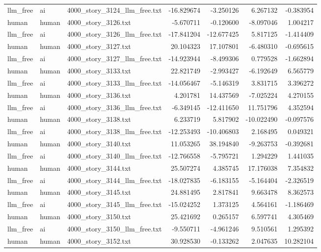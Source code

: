 \begin{longtable}{lllrrrr}
llm\_free & ai & 4000\_story\_3124\_llm\_free.txt & -16.829674 & -3.250126 & 6.267132 & -0.383954 \\
human & human & 4000\_story\_3126.txt & -5.670711 & -0.120600 & -8.097046 & 1.004217 \\
llm\_free & ai & 4000\_story\_3126\_llm\_free.txt & -17.841204 & -12.677425 & 5.817125 & -1.414409 \\
human & human & 4000\_story\_3127.txt & 20.104323 & 17.107801 & -6.480310 & -0.695615 \\
llm\_free & ai & 4000\_story\_3127\_llm\_free.txt & -14.923944 & -8.499306 & 0.779528 & -1.662894 \\
human & human & 4000\_story\_3133.txt & 22.821749 & -2.993427 & -6.192649 & 6.565779 \\
llm\_free & ai & 4000\_story\_3133\_llm\_free.txt & -14.056467 & -5.146319 & 3.831715 & 3.396272 \\
human & human & 4000\_story\_3136.txt & 4.201781 & 14.437569 & -7.025224 & 4.270155 \\
llm\_free & ai & 4000\_story\_3136\_llm\_free.txt & -6.349145 & -12.411650 & 11.751796 & 4.352594 \\
human & human & 4000\_story\_3138.txt & 6.233719 & 5.817902 & -10.022490 & -0.097576 \\
llm\_free & ai & 4000\_story\_3138\_llm\_free.txt & -12.253493 & -10.406803 & 2.168495 & 0.049321 \\
human & human & 4000\_story\_3140.txt & 11.053265 & 38.194840 & -9.263753 & -0.392681 \\
llm\_free & ai & 4000\_story\_3140\_llm\_free.txt & -12.766558 & -5.795721 & 1.294229 & 1.441035 \\
human & human & 4000\_story\_3144.txt & 25.507274 & 4.385745 & 17.176038 & 7.354832 \\
llm\_free & ai & 4000\_story\_3144\_llm\_free.txt & -18.027835 & -6.183155 & -5.164404 & -2.326519 \\
human & human & 4000\_story\_3145.txt & 24.881495 & 2.817841 & 9.663478 & 8.362573 \\
llm\_free & ai & 4000\_story\_3145\_llm\_free.txt & -15.024252 & 1.373125 & 4.564161 & -1.186469 \\
human & human & 4000\_story\_3150.txt & 25.421692 & 0.265157 & 6.597741 & 4.305469 \\
llm\_free & ai & 4000\_story\_3150\_llm\_free.txt & -9.550711 & -4.961246 & 9.510561 & 1.295392 \\
human & human & 4000\_story\_3152.txt & 30.928530 & -0.133262 & 2.047635 & 10.282104 \\

\end{longtable}
